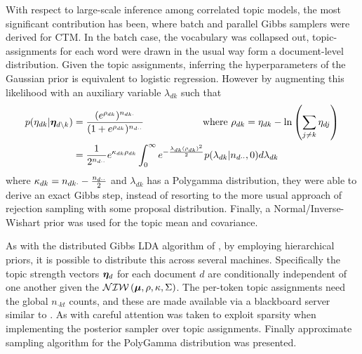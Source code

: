 With respect to large-scale inference among correlated topic models, the most significant contribution has been\cite{Chen2013}, where batch and parallel Gibbs samplers were derived for CTM. In the batch case, the  vocabulary was collapsed out, topic-assignments for each word were drawn in the usual way form a document-level distribution. Given the topic assignments, inferring the hyperparameters of the Gaussian prior is equivalent to logistic regression. However by augmenting this likelihood with an auxiliary variable $\lambda_{dk}$ such that
\begin{align}
p(\eta_{dk} | \bm \eta_{d\setminus k}) & = \frac{(e^{\rho_{dk}})^{n_{dk\cdot}}}{(1 + e^{\rho_{dk}})^{n_{d\cdot\cdot}}} \qquad\qquad\qquad\text{where }\rho_{dk} = \eta_{dk} - \ln\left(\sum_{j \neq k} \eta_{dj}\right) \\
&= \frac{1}{2^{n_{d\cdot\cdot}}}
e^{\kappa_{dk} \rho_{dk}}
\int_0^\infty e^{-\frac{\lambda_{dk} (\rho_{dk})^2}{2}} p(\lambda_{dk}|n_{d\cdot\cdot},0) d\lambda_{dk} 
\end{align}
where $\kappa_{dk} = n_{dk\cdot} - \frac{n_{d\cdot\cdot}}{2}$ and $\lambda_{dk}$ has a Polygamma distribution, they were able to derive an exact Gibbs step, instead of resorting to the more usual approach of rejection sampling with some proposal distribution. Finally, a Normal/Inverse-Wishart prior was used for the topic mean and covariance.

As with the distributed Gibbs LDA algorithm of \cite{Newman2009}, by employing hierarchical priors, it is possible to distribute this across several machines. Specifically the topic strength vectors $\bm \eta_d$ for each document $d$ are conditionally independent of one another given the $\mathcal{NIW}\left(\bm \mu, \rho, \kappa, \Sigma\right)$. The per-token topic assignments need the global $n_{\cdot k t}$ counts, and these are made available via a blackboard server similar to \cite{Smola2010}. As with \cite{Yao2009} careful attention was taken to exploit sparsity when implementing the posterior sampler over topic assignments. Finally approximate sampling algorithm for the PolyGamma distribution was presented.









